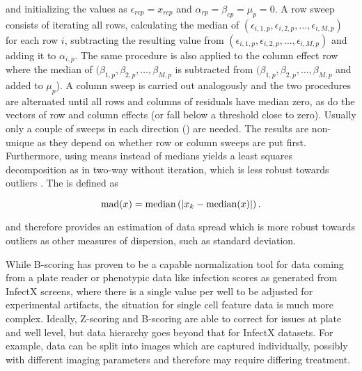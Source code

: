 and initializing the values as $\epsilon_{rcp} = x_{rcp}$ and $\alpha_{rp} = \beta_{cp} = \mu_p = 0$. A row sweep consists of iterating all rows, calculating the median of $(\epsilon_{i,1,p}, \epsilon_{i,2,p}, \dotsc, \epsilon_{i,M,p})$ for each row $i$, subtracting the resulting value from $(\epsilon_{i,1,p}, \epsilon_{i,2,p}, \dotsc, \epsilon_{i,M,p})$ and adding it to $\alpha_{i,p}$. The same procedure is also applied to the column effect row where the median of $(\beta_{1,p}, \beta_{2,p}, \dotsc, \beta_{M,p}$ is subtracted from $(\beta_{1,p}, \beta_{2,p}, \dotsc, \beta_{M,p}$ and added to $\mu_p$). A column sweep is carried out analogously and the two procedures are alternated until all rows and columns of residuals have median zero, as do the vectors of row and column effects (or fall below a threshold close to zero). Usually only a couple of sweeps in each direction () are needed. The results are non-unique as they depend on whether row or column sweeps are put first. Furthermore, using means instead of medians yields a least squares decomposition as in two-way  without iteration, which is less robust towards outliers \citep{Brown2006,Venables2002}. The  is defined as

\begin{equation}
  \operatorname{mad}(x) = \operatorname{median}\left(\lvert x_k-\operatorname{median}(x)\rvert\right).
\end{equation}

and therefore provides an estimation of data spread which is more robust towards outliers as other measures of dispersion, such as standard deviation.

While B-scoring has proven to be a capable normalization tool for data coming from a plate reader or phenotypic data like infection scores as generated from InfectX screens, where there is a single value per well to be adjusted for experimental artifacts, the situation for single cell feature data is much more complex. Ideally, Z-scoring and B-scoring are able to correct for issues at plate and well level, but data hierarchy goes beyond that for InfectX datasets. For example, data can be split into images which are captured individually, possibly with different imaging parameters and therefore may require differing treatment.

